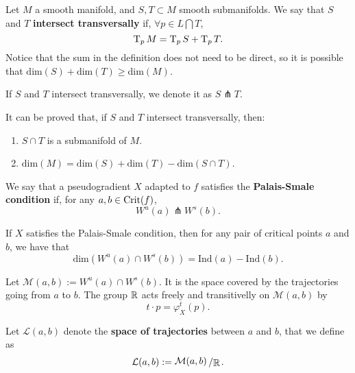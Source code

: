 \begin{deff}
Let $M$ a smooth manifold, and $S, T \subset M$ smooth submanifolds. We say that $S$ and $T$ {\bf intersect transversally} if, $\forall p \in L \bigcap T$,
$$\operatorname T_pM = \operatorname T_pS + \operatorname T_pT .$$
Notice that the sum in the definition does not need to be direct, so it is possible that $\text{dim}(S)+\text{dim}(T) \geq \text{dim}(M)$.

If $S$ and $T$ intersect transversally, we denote it as $S \pitchfork T$.
\end{deff}

It can be proved that, if $S$ and $T$ intersect transversally, then:

\begin{enumerate}
	\item $S \cap T$ is a submanifold of $M$.
	\item $\text{dim}(M) = \text{dim}(S) + \text{dim}(T) - \text{dim}(S \cap T)$.
\end{enumerate}

\begin{deff}
We say that a pseudogradient $X$ adapted to $f$ satisfies the {\bf Palais-Smale condition} if, for any $a,b \in \mathrm{Crit}(f)$,
$$W^u(a) \pitchfork W^s(b) .$$
\end{deff}

\begin{rmrk}
If $X$ satisfies the Palais-Smale condition, then for any pair of critical points $a$ and $b$, we have that
\begin{equation} \label{eq:dimIntersect}
\text{dim}(W^u(a) \cap W^s(b)) = \text{Ind}(a) - \text{Ind}(b) .
\end{equation}
\end{rmrk}


Let $\mathcal{M}(a,b) := W^u(a) \cap W^s(b)$. It is the space covered by the trajectories going from $a$ to $b$. The group $\mathbb{R}$ acts freely and transitivelly on $\mathcal{M}(a,b)$ by
\begin{displaymath}
t \cdot p = \varphi_X^t(p) .
\end{displaymath}

\begin{deff}
Let $\mathcal{L}(a,b)$ denote the {\bf space of trajectories} between $a$ and $b$, that we define as
\begin{displaymath}
\mathcal{L}(a,b) := \quocient{\mathcal{M}(a,b)}{\R} .
\end{displaymath}
\end{deff}


